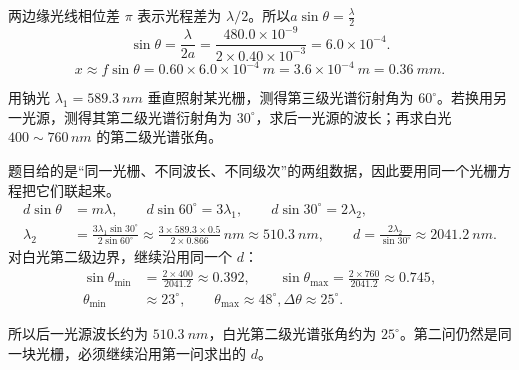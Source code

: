 \begin{solution}
两边缘光线相位差 \(\pi\) 表示光程差为 \(\lambda/2\)。所以$a\sin\theta=\frac{\lambda}{2}$
\[\sin\theta=\frac{\lambda}{2a} =\frac{480.0\times10^{-9}}{2\times0.40\times10^{-3}} =6.0\times10^{-4}.\]
 \[x\approx f\sin\theta =0.60\times6.0\times10^{-4}\ \si{m} =3.6\times10^{-4}\ \si{m} =\SI{0.36}{mm}.\]
\end{solution}

\begin{exercise}[钠光与另一光源在同一光栅上怎样比较波长]
用钠光 \(\lambda_1=\SI{589.3}{nm}\) 垂直照射某光栅，测得第三级光谱衍射角为 \(60^\circ\)。若换用另一光源，测得其第二级光谱衍射角为 \(30^\circ\)，求后一光源的波长；再求白光 \(400\sim760\,\si{nm}\) 的第二级光谱张角。
\end{exercise}

\begin{solution}
题目给的是“同一光栅、不同波长、不同级次”的两组数据，因此要用同一个光栅方程把它们联起来。
\[
\begin{aligned}
d\sin\theta&=m\lambda,\qquad
d\sin60^\circ=3\lambda_1,\qquad
d\sin30^\circ=2\lambda_2,\\
\lambda_2&=\frac{3\lambda_1\sin30^\circ}{2\sin60^\circ}
\approx \frac{3\times589.3\times0.5}{2\times0.866}\,\si{nm}
\approx \SI{510.3}{nm},\qquad
d=\frac{2\lambda_2}{\sin30^\circ}\approx \SI{2041.2}{nm}.
\end{aligned}
\]
对白光第二级边界，继续沿用同一个 \(d\)：
\[
\begin{aligned}
\sin\theta_{\min}&=\frac{2\times400}{2041.2}\approx0.392,\qquad
\sin\theta_{\max}=\frac{2\times760}{2041.2}\approx0.745,\\
\theta_{\min}&\approx23^\circ,\qquad
\theta_{\max}\approx48^\circ,
\Delta\theta\approx25^\circ.
\end{aligned}
\]

所以后一光源波长约为 \(\SI{510.3}{nm}\)，白光第二级光谱张角约为 \(25^\circ\)。第二问仍然是同一块光栅，必须继续沿用第一问求出的 \(d\)。
\end{solution}
